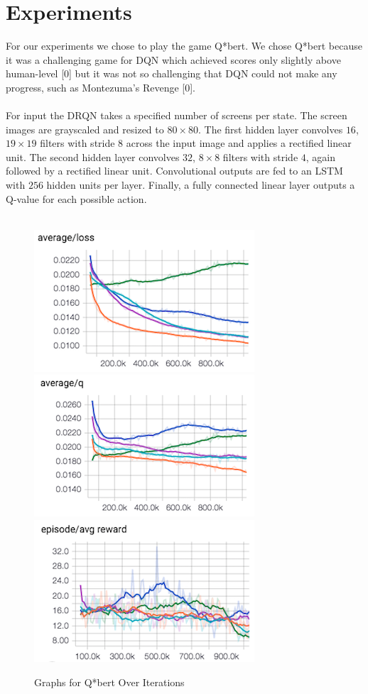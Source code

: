 \documentclass{article}
\begin{document}
\section{Experiments}
For our experiments we chose to play the game Q*bert. We chose Q*bert because it
was a challenging game for DQN which achieved scores only slightly above human-level
[0] but it was not so challenging that DQN could not make any progress, such as
Montezuma's Revenge [0]. \\
\\
For input the DRQN takes a specified number of screens per state. The screen images
are grayscaled and resized to $80 \times 80$. The first hidden layer convolves $16$,
$19 \times 19$ filters with stride 8 across the input image and applies a rectified
linear unit.  The second hidden layer convolves $32$, $8 \times 8$ filters with
stride $4$, again followed by a rectified linear unit.  Convolutional outputs are
fed to an LSTM with $256$ hidden units per layer.  Finally, a fully connected
linear layer outputs a Q-value for each possible action. \\
\\

\begin{figure}[h]
    \centering
    \begin{minipage}{1.0\textwidth}
        \centering
        \includegraphics[scale=0.4]{avg_loss}
        \centering
        \includegraphics[scale=0.4]{avg_q}
        \centering
        \includegraphics[scale=0.4]{episode_avg_reward}
    \end{minipage}
    \caption{Graphs for Q*bert Over Iterations}
\end{figure}
\end{document}
